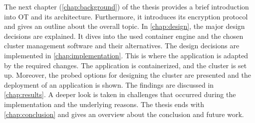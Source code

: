 



The next chapter (\autoref{chap:background}) of the thesis provides a brief introduction into \ac{OT} and its architecture. Furthermore, it introduces its encryption protocol and gives an outline about the overall topic. In \autoref{chap:design}, the major design decisions are explained. It dives into the used container engine and the chosen cluster management software and their alternatives.
The design decisions are implemented in \autoref{chap:implementation}. This is where the application is adapted by the required changes. The application is containerized, and the cluster is set up. Moreover, the probed options for designing the cluster are presented and the deployment of an application is shown.
The findings are discussed in \autoref{chap:results}. A deeper look is taken in challenges that occurred during the implementation and the underlying reasons.
The thesis ends with \autoref{chap:conclusion} and gives an overview about the conclusion and future work.
